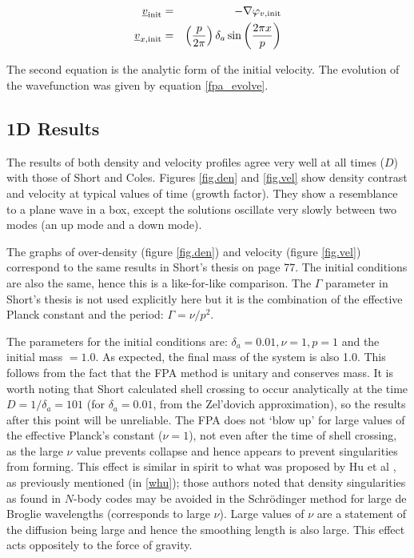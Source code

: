 \begin{eqnarray}
\underline{v}_{\rm init} &=& -\nabla \varphi_{v,\rm init} \\
\underline{v}_{x,\rm init} &=& \left(\frac{p}{2 \pi}\right) \delta_a \sin\left(\frac{2 \pi x}{p} \right)
\end{eqnarray}

\noindent The second equation is the analytic form of the initial velocity. The evolution of the wavefunction was given by equation \ref{fpa_evolve}.


\subsection{1D Results}
The results of both density and velocity profiles agree very well at all times ($D$) with those of Short and Coles. Figures \ref{fig.den} and \ref{fig.vel} show density contrast and velocity at typical values of time (growth factor). They show a resemblance to a plane wave in a box, except the solutions oscillate very slowly between two modes (an up mode and a down mode).

The graphs of over-density (figure \ref{fig.den}) and velocity (figure \ref{fig.vel}) correspond to the same results in Short's thesis on page 77. The initial conditions are also the same, hence this is a like-for-like comparison. The $\Gamma$ parameter in Short's thesis is not used explicitly here but it is the combination of the effective Planck constant and the period: $\Gamma = \nu/p^2$.

The parameters for the initial conditions are: $\delta_a = 0.01, \nu = 1, p = 1$ and the initial mass $= 1.0$. As expected, the final mass of the system is also 1.0. This follows from the fact that the FPA method is unitary and conserves mass. It is worth noting that Short calculated shell crossing to occur analytically at the time $D = 1/\delta_a = 101$ (for $\delta_a = 0.01$, from the Zel'dovich approximation), so the results after this point will be unreliable. The FPA does not `blow up' for large values of the effective Planck's constant ($\nu=1$), not even after the time of shell crossing, as the large $\nu$ value prevents collapse and hence appears to  prevent singularities from forming. This effect is similar in spirit to what was proposed by Hu et al \citep{bib_whu}, as previously mentioned (in \ref{whu}); those authors noted that density singularities as found in $N$-body codes may be avoided in the Schr\"odinger method for large de Broglie wavelengths (corresponds to large $\nu$). Large values of $\nu$ are a statement of the diffusion being large and hence the smoothing length is also large. This effect acts oppositely to the force of gravity.


